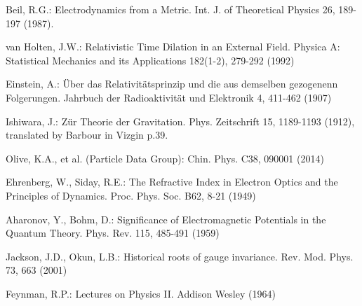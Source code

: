 \begin{thebibliography}{}
Beil, R.G.:
Electrodynamics from a Metric.
Int. J. of Theoretical Physics 26, 189-197 (1987).

van Holten, J.W.:
Relativistic Time Dilation in an External Field.
Physica A: Statistical Mechanics and its Applications 182(1-2), 279-292 (1992)




Einstein, A.:
\"{U}ber das Relativit\"{a}tsprinzip und die aus demselben gezogenenn Folgerungen.
Jahrbuch der Radioaktivit\"{a}t und Elektronik 4, 411-462 (1907)

Ishiwara, J.:
Z\"{u}r Theorie der Gravitation.
Phys. Zeitschrift 15, 1189-1193 (1912),
translated by Barbour in Vizgin p.39.

Olive, K.A., et al. (Particle Data Group):
Chin. Phys. C38, 090001 (2014)

Ehrenberg, W., Siday, R.E.:
The Refractive Index in Electron Optics and the Principles of Dynamics.
Proc. Phys. Soc. B62, 8-21 (1949)

Aharonov, Y., Bohm, D.:
Significance of Electromagnetic Potentials in the Quantum Theory.
Phys. Rev. 115, 485-491 (1959)

Jackson, J.D., Okun, L.B.:
Historical roots of gauge invariance.
Rev. Mod. Phys. 73, 663 (2001)

Feynman, R.P.:
Lectures on Physics II.
Addison Wesley (1964)


\end{thebibliography}
